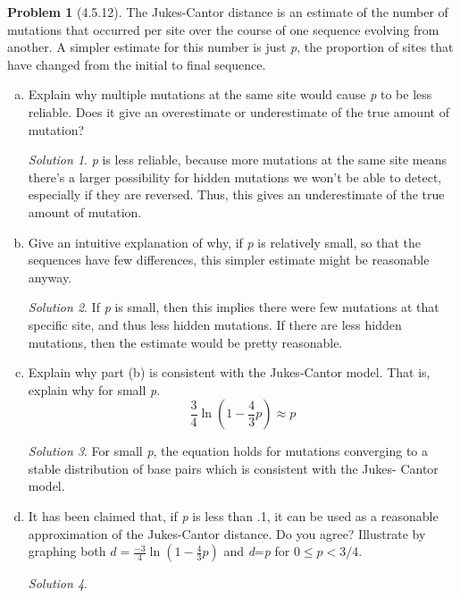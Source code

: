 \documentclass[11pt]{article}
\theoremstyle{definition}\newtheorem*{problem}{Problem}
\theoremstyle{remark}\newtheorem{claim}{Claim}
\theoremstyle{remark}\newtheorem*{sol}{Solution}
\begin{document}
\begin{problem}[4.5.12] 
The Jukes-Cantor distance is an estimate of the number of mutations that occurred per site over the course of one sequence evolving from another. A simpler estimate for this number is just \textit{p}, the proportion of sites that have changed from the initial to final sequence.
\end{problem}
\begin{enumerate}[a.]

\item Explain why multiple mutations at the same site would cause \textit{p} to be less reliable. Does it give an overestimate or underestimate of the true amount of mutation?
\begin{sol} \textit{p} is less reliable, because more mutations at the same site means there's a larger possibility for hidden mutations we won't be able to detect, especially if they are reversed. Thus, this gives an underestimate of the true amount of mutation.
\end{sol}

\item Give an intuitive explanation of why, if \textit{p} is relatively small, so that the sequences have few differences, this simpler estimate might be reasonable anyway.
\begin{sol}
If \textit{p} is small, then this implies there were few mutations at that specific site, and thus less hidden mutations. If there are less hidden mutations, then the estimate would be pretty reasonable.
\end{sol}

\item Explain why part (b) is consistent with the Jukes-Cantor model. That is, explain why for small \textit{p}.
\begin{equation*}
\frac{3}{4} \ln (1-\frac{4}{3}p) \approx p
\end{equation*}

\begin{sol}
For small \textit{p}, the equation holds for mutations converging to a stable distribution of base pairs which is consistent with the Jukes- Cantor model.
\end{sol}

\item It has been claimed that, if \textit{p} is less than .1, it can be used as a reasonable approximation of the Jukes-Cantor distance. Do you agree? Illustrate by graphing both \begin{math} d = \frac{-3}{4}\ln (1- \frac{4}{3}p)\end{math} and \textit{d}=\textit{p} for \begin{math} 0\leq p<  3/4. \end{math}

\begin{sol}
\end{sol}

\end{enumerate}
\end{document}
